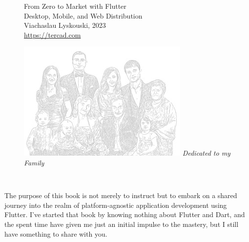 
\thispagestyle{empty}

\begin{figure}
  \begin{minipage}{0.59\textwidth}
    \large From Zero to Market with Flutter\\
    \vspace{9mm}
    \noindent \small Desktop, Mobile, and Web Distribution\\
    \vspace{10mm}
    Viachaslau Lyskouski, 2023\\
    \href{https://tercad.com}{https://tercad.com}\\
    \vspace{2mm}
  \end{minipage}
  \hfill
  \begin{minipage}{0.31\textwidth}
    \includegraphics[width=\textwidth]{_cover/to.jpg}
    \emph{Dedicated to my Family}\\
  \end{minipage}
\end{figure}
~
\vspace{2cm}

\noindent The purpose of this book is not merely to instruct but to embark on a shared journey into the realm of 
platform-agnostic application development using Flutter. I've started that book by knowing nothing about Flutter and 
Dart, and the spent time have given me just an initial impulse to the mastery, but I still have something to share with 
you. 

